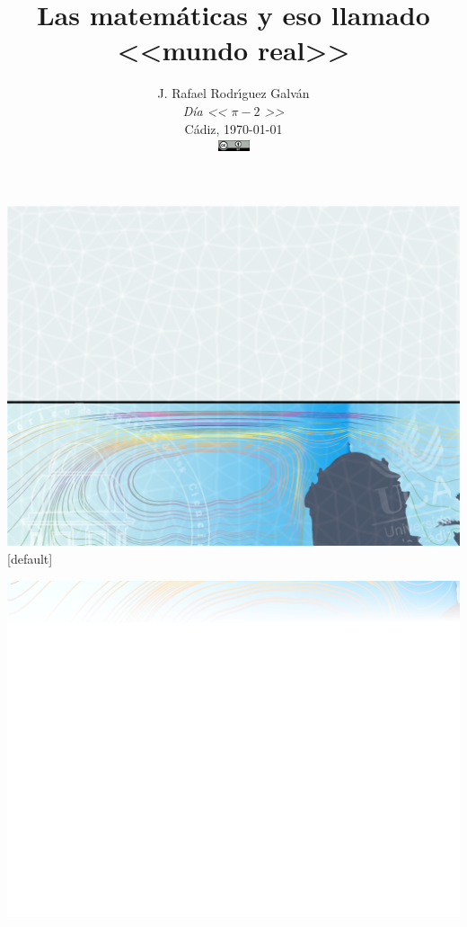 \documentclass[
  unknownkeysallowed %
]{beamer}
\title[C\'adiz Num\'erica 2013]
{Las matemáticas y eso llamado <<mundo real>>}
\author[J. R. Rguez. Galv\'an]{%
  { J. Rafael Rodr\'{\i}guez Galv\'an}
  \\[1.2em]
  {\small \em Día << $\pi-2$ >>}
  \\[0.2em]
  {\scriptsize Cádiz, \today}
  \\[0.9em]
  \includegraphics[width=2.5em]{img/cc-by}
}
\date{}
\begin{document}

%
%
 {\includegraphics[width=\paperwidth,height=\paperheight]{frontpage_bg}}
[default]

\begin{frame}
  \titlepage
  \vspace{2.5cm}
\end{frame}

%
%

 {\includegraphics[width=\paperwidth,height=\paperheight]{slide_bg}}
\end{document}
